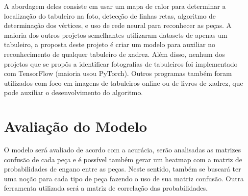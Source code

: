 \documentclass[a4paper,12pt,twoside]{article}
\begin{document}
A abordagem deles consiste em usar um mapa de calor para determinar a localização do tabuleiro na foto, detecção de linhas retas, algoritmo de determinação dos vértices, e uso de rede neural para reconhecer as peças.
A maioria dos outros projetos semelhantes utilizaram datasets de apenas um tabuleiro, a proposta deste projeto é criar um modelo para auxiliar no reconhecimento de qualquer tabuleiro de xadrez.
Além disso, nenhum dos projetos que se propôs a identificar fotografias de tabuleiros foi implementado com TensorFlow (maioria usou PyTorch).
Outros programas também foram utilizados com foco em imagens de tabuleiros online ou de livros de xadrez, que pode auxiliar o desenvolvimento do algoritmo.

\section{Avaliação do Modelo}
O modelo será avaliado de acordo com a acurácia, serão analisadas as matrizes confusão de cada peça e é possível também gerar um heatmap com a matriz de probabilidades de engano entre as peças.
Neste sentido, também se buscará ter uma noção para cada tipo de peça fazendo o uso de sua matriz confusão. Outra ferramenta utilizada será a matriz de correlação das probabilidades.

\nocite{*}
\printbibliography
\end{document}
